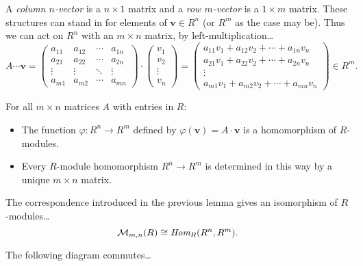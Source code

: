A \label{vector} \emph{column $n$-vector} is a $n \times 1$ matrix and a \emph{row $m$-vector} is a $1 \times m$ matrix. These structures
can stand in for elements of $\textbf{v} \in R^n$ (or $R^m$ as the case may be). Thus we can act on $R^n$ with an $m \times n$ matrix, by
left-multiplication\dots
\[
A \cdots \textbf{v} =
\begin{pmatrix}
	a_{11} & a_{12} & \cdots & a_{1n} \\
	a_{21} & a_{22} & \cdots & a_{2n} \\
	\vdots & \vdots & \ddots & \vdots \\
	a_{m1} & a_{m2} & \cdots & a_{mn}
\end{pmatrix}
\cdot
\begin{pmatrix}
	v_{1}\\
	v_{2}\\
	\vdots\\
	v_{n}
\end{pmatrix}
=
\begin{pmatrix}
	a_{11}v_1 + a_{12}v_2 + \cdots + a_{1n}v_n\\
	a_{21}v_1 + a_{22}v_2 + \cdots + a_{2n}v_n\\
	\vdots\\
	a_{m1}v_1 + a_{m2}v_2 + \cdots + a_{mn}v_n
\end{pmatrix}
\in R^m.
\]
\begin{lemma}
For all $m \times n$ matrices $A$ with entries in $R$:
\begin{itemize}
  \item The function $\varphi : R^n \rightarrow R^m$ defined by $\varphi(\textbf{v}) = A \cdot \textbf{v}$ is a
  homomorphism of $R$-modules.
  \item Every $R$-module homomorphism $R^n \rightarrow R^m$ is determined in this way by a unique $m \times n$ matrix.
\end{itemize}
\end{lemma}

\begin{corollary}
The correspondence introduced in the previous lemma gives an isomorphism of $R$-modules\dots
$$\mathcal{M}_{m,n}(R) \cong \emph{Hom}_R(R^n,R^m).$$
\end{corollary}

\begin{lemma}
The following diagram commutes\dots
\begin{figure}[H]
\centering

\end{figure}
\end{lemma}

